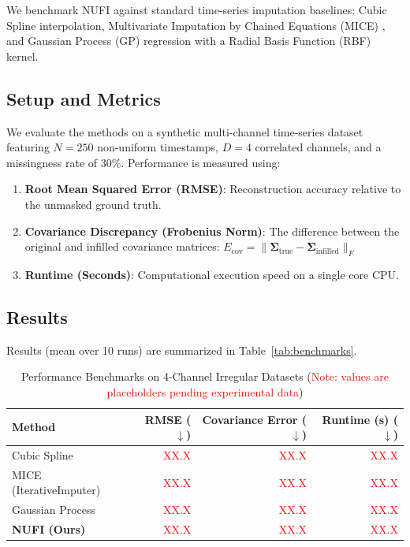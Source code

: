 \documentclass[11pt,a4paper]{article}
\begin{document}
We benchmark NUFI against standard time-series imputation baselines: Cubic Spline interpolation, Multivariate Imputation by Chained Equations (MICE) \cite{vanBuuren2011}, and Gaussian Process (GP) regression with a Radial Basis Function (RBF) kernel. 

\subsection{Setup and Metrics}
We evaluate the methods on a synthetic multi-channel time-series dataset featuring $N = 250$ non-uniform timestamps, $D = 4$ correlated channels, and a missingness rate of $30\%$. Performance is measured using:
\begin{enumerate}
    \item \textbf{Root Mean Squared Error (RMSE)}: Reconstruction accuracy relative to the unmasked ground truth.
    \item \textbf{Covariance Discrepancy (Frobenius Norm)}: The difference between the original and infilled covariance matrices: $E_{\text{cov}} = \|\boldsymbol{\Sigma}_{\text{true}} - \boldsymbol{\Sigma}_{\text{infilled}}\|_F$
    \item \textbf{Runtime (Seconds)}: Computational execution speed on a single core CPU.
\end{enumerate}

\subsection{Results}
Results (mean over 10 runs) are summarized in Table~\ref{tab:benchmarks}.

\begin{table}[h]
\centering
\caption{Performance Benchmarks on 4-Channel Irregular Datasets (\textcolor{red}{Note: values are placeholders pending experimental data})}
\vspace{0.5em}
\begin{tabular}{lrrr}
\toprule
\textbf{Method} & \textbf{RMSE ($\downarrow$)} & \textbf{Covariance Error ($\downarrow$)} & \textbf{Runtime (s) ($\downarrow$)} \\
\midrule
Cubic Spline & \textcolor{red}{XX.X} & \textcolor{red}{XX.X} & \textcolor{red}{XX.X} \\
MICE (IterativeImputer) & \textcolor{red}{XX.X} & \textcolor{red}{XX.X} & \textcolor{red}{XX.X} \\
Gaussian Process & \textcolor{red}{XX.X} & \textcolor{red}{XX.X} & \textcolor{red}{XX.X} \\
\textbf{NUFI (Ours)} & \textcolor{red}{XX.X} & \textcolor{red}{XX.X} & \textcolor{red}{XX.X} \\
\bottomrule
\end{tabular}
\end{table}
\end{document}
